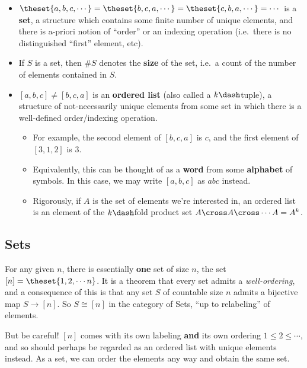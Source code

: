 \begin{itemize}
\item
  \(\theset{a, b, c, \cdots} = \theset{b, c, a, \cdots} = \theset{c, b, a, \cdots} = \cdots\)
  is a \textbf{set}, a structure which contains some finite number of
  unique elements, and there is a-priori notion of ``order'' or an
  indexing operation (i.e.~there is no distinguished ``first'' element,
  etc).
\item
  If \(S\) is a set, then \(\# S\) denotes the \textbf{size} of the set,
  i.e.~a count of the number of elements contained in \(S\).
\item
  \([a, b, c] \neq [b, c, a]\) is an \textbf{ordered list} (also called
  a \(k\dash\)tuple), a structure of not-necessarily unique elements
  from some set in which there is a well-defined order/indexing
  operation.

  \begin{itemize}
  \tightlist
  \item
    For example, the second element of \([b,c,a]\) is \(c\), and the
    first element of \([3,1,2]\) is 3.
  \item
    Equivalently, this can be thought of as a \textbf{word} from some
    \textbf{alphabet} of symbols. In this case, we may write \([a,b,c]\)
    as \(abc\) instead.
  \item
    Rigorously, if \(A\) is the set of elements we're interested in, an
    ordered list is an element of the \(k\dash\)fold product set
    \(A \cross A \cross \cdots A = A^k\).
  \end{itemize}
\end{itemize}

\hypertarget{sets}{%
\subsection{Sets}\label{sets}}

For any given \(n\), there is essentially \textbf{one} set of size
\(n\), the set \([n] = \theset{1,2,\cdots n}\). It is a theorem that
every set admits a \emph{well-ordering}, and a consequence of this is
that any set \(S\) of countable size \(n\) admits a bijective map
\(S \to [n]\). So \(S \cong [n]\) in the category of Sets, ``up to
relabeling'' of elements.

But be careful! \([n]\) comes with its own labeling \textbf{and } its
own ordering \(1 \leq 2 \leq \cdots\), and so should perhaps be regarded
as an ordered list with unique elements instead. As a set, we can order
the elements any way and obtain the same set.

